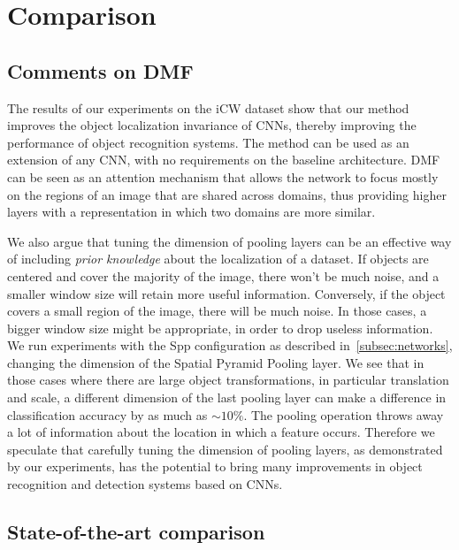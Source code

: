 \documentclass[../main.tex]{subfiles}
\begin{document}
    \chapter{Comparison}\label{chap:comparison}

    \section{Comments on DMF}\label{sec:dmf-comments}

    The results of our experiments on the iCW dataset show that our method improves the object localization invariance
    of CNNs, thereby improving the performance of object recognition systems. The method can be used as an extension
    of any CNN, with no requirements on the baseline architecture. DMF can be seen as an attention mechanism that
    allows the network to focus mostly on the regions of an image that are shared across domains, thus providing higher
    layers with a representation in which two domains are more similar.

    We also argue that tuning the dimension of pooling layers can be an effective way of including \textit{prior knowledge}
    about the localization of a dataset. If objects are centered and cover the majority of the image, there won't be much
    noise, and a smaller window size will retain more useful information. Conversely, if the object covers a small region
    of the image, there will be much noise. In those cases, a bigger window size might be appropriate, in order to drop
    useless information. We run experiments with the Spp configuration as described in~\ref{subsec:networks}, changing the
    dimension of the Spatial Pyramid Pooling layer. We see that in those cases where there are large object transformations,
    in particular translation and scale, a different dimension of the last pooling layer can make a difference in
    classification accuracy by as much as $\sim 10\%$. The pooling operation throws away a lot of information about the location
    in which a feature occurs. Therefore we speculate that carefully tuning the dimension of pooling layers, as demonstrated
    by our experiments, has the potential to bring many improvements in object recognition and detection systems
    based on CNNs.

    \section{State-of-the-art comparison}
\end{document}
